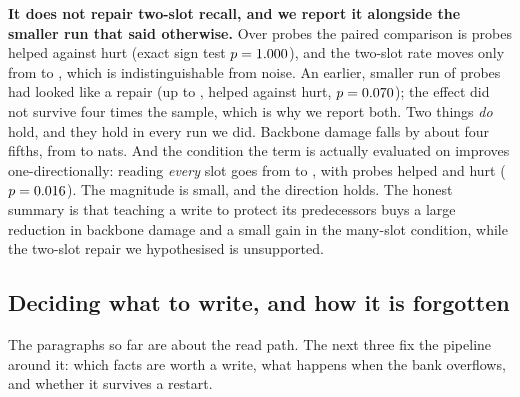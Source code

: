 \documentclass[11pt]{article}
\begin{document}
\textbf{It does not repair two-slot recall, and we report it alongside the smaller run that said otherwise.} Over \tRetentionProbes{} probes the paired comparison is
\tRetentionHelped{} probes helped against \tRetentionHurt{} hurt (exact sign test
$p = 1.000{}$), and the two-slot rate moves only from \tRetentionTopTwoBase{} to \tRetentionTopTwoBest{}, which is indistinguishable from noise. An earlier, smaller run
of \tRetentionSmallProbes{} probes had looked like a repair (up to
\tRetentionSmallBest{}, \tRetentionSmallHelped{} helped against
\tRetentionSmallHurt{} hurt, $p = 0.070{}$); the effect did not survive
four times the sample, which is why we report both. Two things \emph{do} hold, and
they hold in every run we did. Backbone damage falls by about four fifths, from
\tRetentionKlBase{} to \tRetentionKlBest{} nats. And the condition the term is
actually evaluated on improves one-directionally: reading \emph{every} slot goes from
\tRetentionAllBase{} to \tRetentionAllBest{}, with \tRetentionAllHelped{} probes helped and \tRetentionAllHurt{} hurt ($p = 0.016{}$). The magnitude is small, and the direction holds. The honest summary is that teaching a write to protect its
predecessors buys a large reduction in backbone damage and a small gain in the
many-slot condition, while the two-slot repair we hypothesised is unsupported.

\subsection{Deciding what to write, and how it is forgotten}

The paragraphs so far are about the read path. The next three fix the pipeline around it:
which facts are worth a write, what happens when the bank overflows, and whether it survives
a restart.
\end{document}
